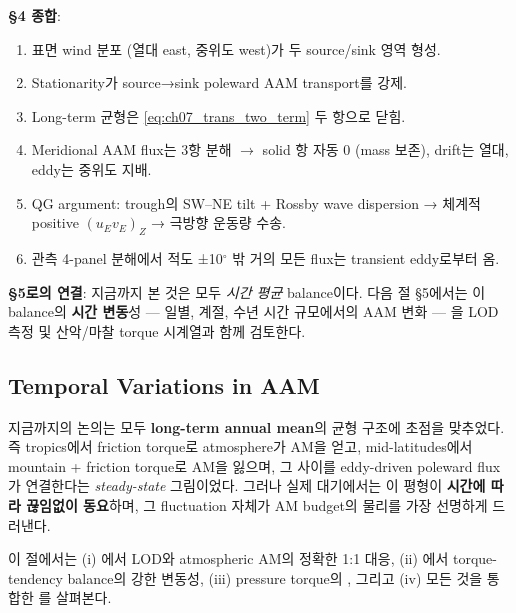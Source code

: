 \begin{hisublock}
\textbf{\S4 종합}:
\begin{enumerate}
  \item 표면 wind 분포 (열대 east, 중위도 west)가 두 source/sink 영역 형성.
  \item Stationarity가 source→sink poleward AAM transport를 강제.
  \item Long-term 균형은 \eqref{eq:ch07_trans_two_term} 두 항으로 닫힘.
  \item Meridional AAM flux는 3항 분해 $\to$ solid 항 자동 0 (mass 보존),
    drift는 열대, eddy는 중위도 지배.
  \item QG argument: trough의 SW--NE tilt + Rossby wave dispersion →
    체계적 positive $(u_E v_E)_Z$ → 극방향 운동량 수송.
  \item 관측 4-panel 분해에서 적도 ±10$^\circ$ 밖 거의 모든 flux는 transient
    eddy로부터 옴.
\end{enumerate}

\medskip
\textbf{\S5로의 연결}: 지금까지 본 것은 모두 \textit{시간 평균} balance이다.
다음 절 \S5에서는 이 balance의 \textbf{시간 변동}성 — 일별, 계절, 수년
시간 규모에서의 AAM 변화 — 을 LOD 측정 및 산악/마찰 torque 시계열과 함께
검토한다.
\end{hisublock}

\subsection{Temporal Variations in AAM}

지금까지의 논의는 모두 \textbf{long-term annual mean}의 균형 구조에 초점을 맞추었다.
즉 tropics에서 friction torque로 atmosphere가 AM을 얻고, mid-latitudes에서
mountain + friction torque로 AM을 잃으며, 그 사이를 eddy-driven poleward
flux가 연결한다는 \emph{steady-state} 그림이었다.  그러나 실제 대기에서는
이 평형이 \textbf{시간에 따라 끊임없이 동요}하며, 그 fluctuation 자체가
AM budget의 물리를 가장 선명하게 드러낸다.

이 절에서는 (i) 에서 LOD와 atmospheric AM의 정확한
1:1 대응, (ii) 에서 torque-tendency balance의 강한
변동성, (iii) pressure torque의 , 그리고
(iv) 모든 것을 통합한 를 살펴본다.

